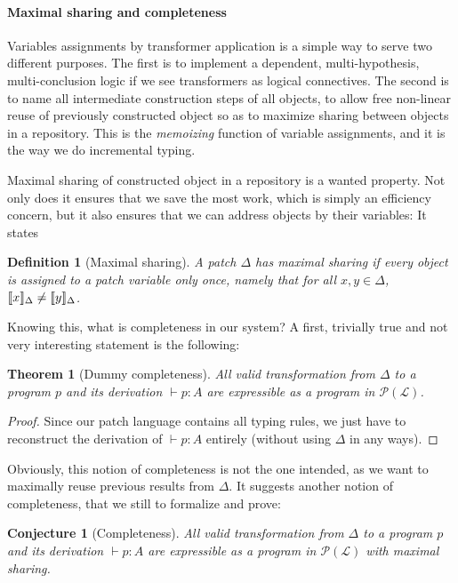 \documentclass[twoside,a4paper,12pt]{article}
\newtheorem{theorem}{Theorem}
\newtheorem{conjecture}{Conjecture}
\newtheorem{definition}{Definition}
\begin{document}
\paragraph{Maximal sharing and completeness}

Variables assignments by transformer application is a simple way to
serve two different purposes. The first is to implement a dependent,
multi-hypothesis, multi-conclusion logic if we see transformers as
logical connectives. The second is to name all intermediate
construction steps of all objects, to allow free non-linear reuse of
previously constructed object so as to maximize sharing between
objects in a repository. This is the \emph{memoizing} function of
variable assignments, and it is the way we do incremental typing.

Maximal sharing of constructed object in a repository is a wanted
property. Not only does it ensures that we save the most work, which
is simply an efficiency concern, but it also ensures that we can
address objects by their variables: It states

\begin{definition}[Maximal sharing]
  A patch $\Delta$ has \emph{maximal sharing} if every object is
  assigned to a patch variable only once, namely that for all
  $x,y\in\Delta$, $\llbracket{x}\rrbracket_\Delta\neq\llbracket{y}\rrbracket_\Delta$.
\end{definition}

Knowing this, what is completeness in our system? A first, trivially
true and not very interesting statement is the following:
\begin{theorem}[Dummy completeness]
  All valid transformation from $\Delta$ to a program $p$ and its
  derivation $\vdash p : A$ are expressible as a program in $\mathcal
  P(\mathcal L)$.
\end{theorem}
\begin{proof}
  Since our patch language contains all typing rules, we just have to
  reconstruct the derivation of $\vdash p:A$ entirely (without using
  $\Delta$ in any ways).
\end{proof}

Obviously, this notion of completeness is not the one intended, as we
want to maximally reuse previous results from $\Delta$. It suggests
another notion of completeness, that we still to formalize and prove:

\begin{conjecture}[Completeness]
  All valid transformation from $\Delta$ to a program $p$ and its
  derivation $\vdash p : A$ are expressible as a program in $\mathcal
  P(\mathcal L)$ with maximal sharing.
\end{conjecture}
\end{document}
